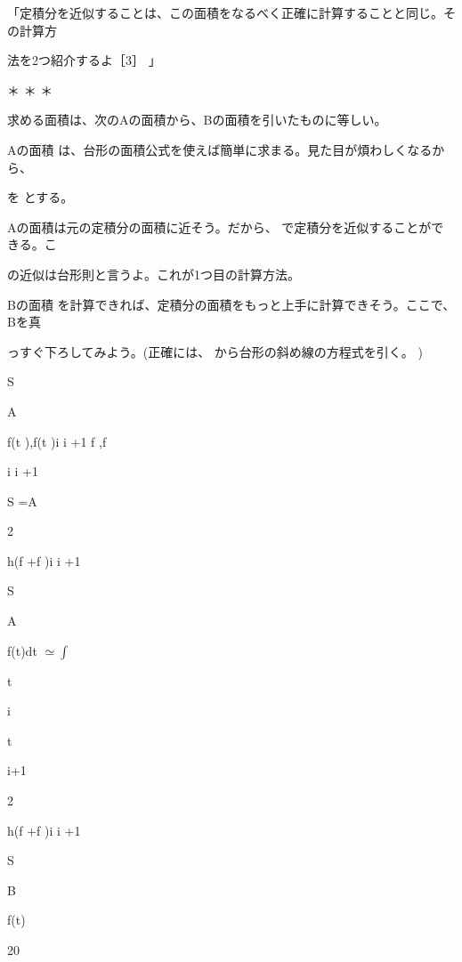 「定積分を近似することは、この⾯積をなるべく正確に計算することと同じ。その計算⽅\par
法を2つ紹介するよ［3］ 」\par
＊ ＊ ＊\par
求める⾯積は、次のAの⾯積から、Bの⾯積を引いたものに等しい。\par
Aの⾯積 は、台形の⾯積公式を使えば簡単に求まる。⾒た⽬が煩わしくなるから、\par
を とする。\par
Aの⾯積は元の定積分の⾯積に近そう。だから、 で定積分を近似することができる。こ\par
の近似は台形則と⾔うよ。これが1つ⽬の計算⽅法。\par
Bの⾯積 を計算できれば、定積分の⾯積をもっと上⼿に計算できそう。ここで、Bを真\par
っすぐ下ろしてみよう。(正確には、 から台形の斜め線の⽅程式を引く。 )\par
S\par
A\par
f(t  ),f(t  )i i +1 f  ,f\par
i i +1\par
S  =A\par
2\par
h(f  +f  )i i +1\par
S\par
A\par
f(t)dt $\simeq$$\int$\par
t\par
i\par
t\par
i+1\par
2\par
h(f  +f  )i i +1\par
S\par
B\par
f(t)\par
20\par

